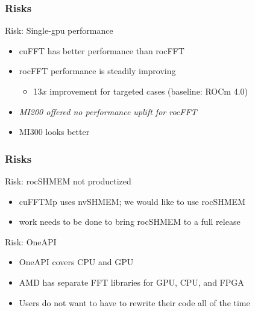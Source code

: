 \documentclass[10pt,aspectratio=169]{beamer}
\begin{document}
\begin{frame}
  \frametitle{Risks}

  \begin{center}
    Risk: Single-gpu performance
  \end{center}
  \begin{itemize}
  \item cuFFT has better performance than rocFFT
  \item rocFFT performance is steadily improving
    \begin{itemize}
    \item 13$x$ improvement for targeted cases (baseline: ROCm 4.0)
    \end{itemize}
  \item \emph{MI200 offered no performance uplift for rocFFT}
  \item MI300 looks better
  \end{itemize}

\end{frame}


\begin{frame}
  \frametitle{Risks}

  \begin{center}
    Risk: rocSHMEM not productized
  \end{center}
  \begin{itemize}
  \item cuFFTMp uses nvSHMEM; we would like to use rocSHMEM
  \item work needs to be done to bring rocSHMEM to a full release
  \end{itemize}

  \medskip

  \begin{center}
    Risk: OneAPI
  \end{center}
  \begin{itemize}
  \item OneAPI covers CPU and GPU
  \item AMD has separate FFT libraries for GPU, CPU, and FPGA
  \item Users do not want to have to rewrite their code all of the time
  \end{itemize}

\end{frame}
\end{document}
